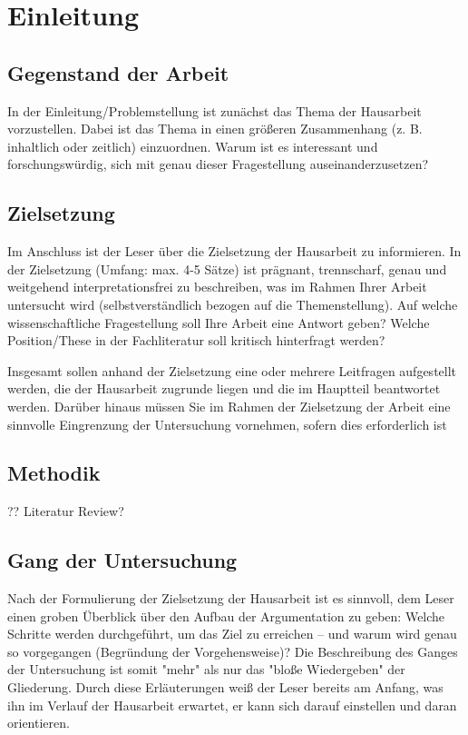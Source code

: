 \chapter{Einleitung}

\section{Gegenstand der Arbeit}

In der Einleitung/Problemstellung ist zunächst das Thema der Hausarbeit vorzustellen. Dabei ist das Thema in einen größeren Zusammenhang (z. B. inhaltlich oder zeitlich) einzuordnen. Warum ist es interessant und forschungswürdig, sich mit genau dieser Fragestellung auseinanderzusetzen?

\section{Zielsetzung}

Im Anschluss ist der Leser über die Zielsetzung der Hausarbeit zu informieren. In der Zielsetzung (Umfang: max. 4-5 Sätze) ist prägnant, trennscharf, genau und weitgehend interpretationsfrei zu beschreiben, was im Rahmen Ihrer Arbeit untersucht wird (selbstverständlich bezogen auf die Themenstellung).
Auf welche wissenschaftliche Fragestellung soll Ihre Arbeit eine Antwort geben? Welche Position/These in der Fachliteratur soll kritisch hinterfragt werden?

Insgesamt sollen anhand der Zielsetzung eine oder mehrere Leitfragen aufgestellt werden, die der Hausarbeit zugrunde liegen und die im Hauptteil beantwortet werden.
Darüber hinaus müssen Sie im Rahmen der Zielsetzung der Arbeit eine sinnvolle Eingrenzung der Untersuchung vornehmen, sofern dies erforderlich ist

\section{Methodik}

??
Literatur Review?

\section{Gang der Untersuchung}

Nach der Formulierung der Zielsetzung der Hausarbeit ist es sinnvoll, dem Leser einen groben Überblick über den Aufbau der Argumentation zu geben: Welche Schritte werden durchgeführt, um das Ziel zu erreichen – und warum wird genau so vorgegangen (Begründung der Vorgehensweise)? Die Beschreibung des Ganges der Untersuchung ist somit "mehr" als nur das "bloße Wiedergeben" der Gliederung. Durch diese Erläuterungen weiß der Leser bereits am Anfang, was ihn im Verlauf der Hausarbeit erwartet, er kann sich darauf einstellen und daran orientieren.

